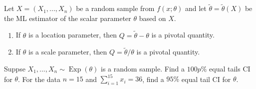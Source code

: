 \documentclass[notoc,notitlepage]{tufte-book}
\DeclareMathOperator{\Exp}{Exp }
\begin{document}
\begin{propo}
\label{propo:mle_of_a_location_scale_parameter_as_a_pivotal_quantity}
  Let $X = (X_1, ..., X_n)$ be a random sample from $f(x; \theta)$ and let $\tilde{\theta} = \tilde{\theta}(X)$ be the ML estimator of the scalar parameter $\theta$ based on $X$.
  \begin{enumerate}
    \item If $\theta$ is a location parameter, then $Q = \tilde{\theta} - \theta$ is a pivotal quantity.
    \item If $\theta$ is a scale parameter, then $Q = \tilde{\theta} / \theta$ is a pivotal quantity.
  \end{enumerate}
\end{propo}


\begin{eg}[Example 6.19]
  Suppse $X_1, ..., X_n \sim \Exp(\theta)$ is a random sample. Find a $100p\%$ equal tails CI for $\theta$. For the data $n = 15$ and $\sum_{i=1}^{15} x_i = 36$, find a $95\%$ equal tail CI for $\theta$.
\end{eg}
\end{document}
